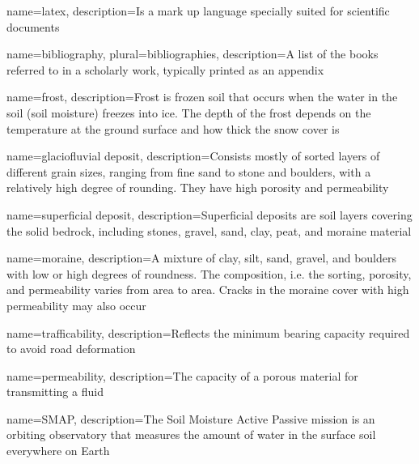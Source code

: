 

\makeglossaries %


{
        name=latex,
        description={Is a mark up language specially suited for
scientific documents}
}

{
        name=bibliography,
        plural=bibliographies,
        description={A list of the books referred to in a scholarly work,
typically printed as an appendix}
}

{
    name=frost,
    description={Frost is frozen soil that occurs when the water in the soil (soil moisture) freezes into ice. The depth of the frost depends on the temperature at the ground surface and how thick the snow cover is \cite{senorge_terminology}}
}

{
    name=glaciofluvial deposit,
    description={Consists mostly of sorted layers of different grain sizes, ranging from fine sand to stone and boulders, with a relatively high degree of rounding. They have high porosity and permeability \cite{ngu_deposits}}
}

{
    name=superficial deposit,
    description={Superficial deposits are soil layers covering the solid bedrock, including stones, gravel, sand, clay, peat, and moraine material \cite{snl_losmasser}}
}

{
    name=moraine,
    description={A mixture of clay, silt, sand, gravel, and boulders with low or high degrees of roundness. The composition, i.e. the sorting, porosity, and permeability varies from area to area. Cracks in the moraine cover with high permeability may also occur \cite{ngu_deposits}}
}

{
    name=trafficability,
    description={Reflects the minimum bearing capacity required to avoid road deformation \cite{fjeld2023trafficability}}
}

{
    name=permeability,
    description={The capacity of a porous material for transmitting a fluid \cite{britannica_permeability}}
}

{
    name=SMAP,
    description={The Soil Moisture Active Passive mission is an orbiting observatory that measures the amount of water in the surface soil everywhere on Earth \cite{nasaSMAP}}
}

